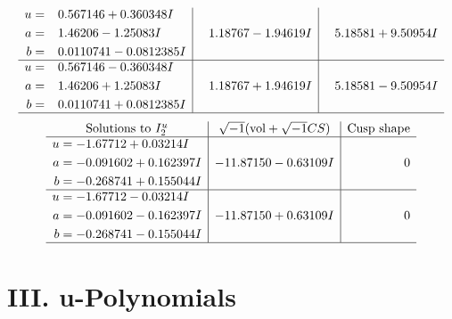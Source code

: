 \documentclass[1p]{elsarticle_modified}
\theoremstyle{definition}
\newcommand{\I}{\sqrt{-1}}
\begin{document}
$$\begin{array}{c|c|c}
\begin{aligned}
u &= \phantom{-}0.567146 + 0.360348 I \\
a &= \phantom{-}1.46206 - 1.25083 I \\
b &= \phantom{-}0.0110741 - 0.0812385 I\end{aligned}
 & \phantom{-}1.18767 - 1.94619 I & \phantom{-}5.18581 + 9.50954 I \\ \hline\begin{aligned}
u &= \phantom{-}0.567146 - 0.360348 I \\
a &= \phantom{-}1.46206 + 1.25083 I \\
b &= \phantom{-}0.0110741 + 0.0812385 I\end{aligned}
 & \phantom{-}1.18767 + 1.94619 I & \phantom{-}5.18581 - 9.50954 I\\
 \hline 
 \end{array}$$\newpage$$\begin{array}{c|c|c}  
\text{Solutions to }I^u_{2}& \I (\text{vol} + \sqrt{-1}CS) & \text{Cusp shape}\\
 \hline 
\begin{aligned}
u &= -1.67712 + 0.03214 I \\
a &= -0.091602 + 0.162397 I \\
b &= -0.268741 + 0.155044 I\end{aligned}
 & -11.87150 - 0.63109 I & \phantom{-0.000000 } 0 \\ \hline\begin{aligned}
u &= -1.67712 - 0.03214 I \\
a &= -0.091602 - 0.162397 I \\
b &= -0.268741 - 0.155044 I\end{aligned}
 & -11.87150 + 0.63109 I & \phantom{-0.000000 } 0\\
 \hline 
 \end{array}$$\newpage
\newpage\renewcommand{\arraystretch}{1}
\centering \section*{ III. u-Polynomials}
\end{document}
